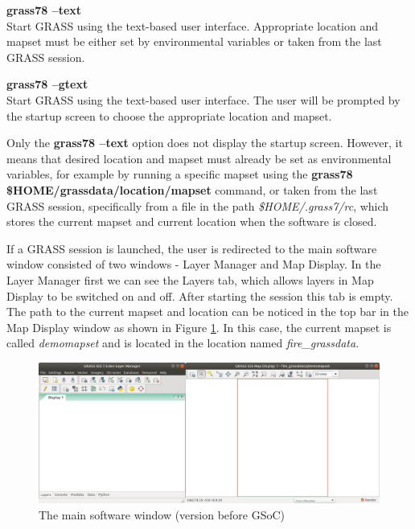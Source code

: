 \documentclass[a4paper,10pt,twoside]{article}
\begin{document}
\noindent \textbf{grass78 --text} \\
\noindent Start GRASS using the text-based user interface. Appropriate location and mapset must be either set by environmental variables or taken from the last GRASS session.

\noindent \textbf{grass78 --gtext} \\
\noindent Start GRASS using the text-based user interface. The user will be prompted by the startup screen to choose the appropriate location and mapset.

Only the \textbf{grass78 --text} option does not display the startup screen. However, it means that desired location and mapset must already be set as environmental variables, for example by running a specific mapset using the \textbf{grass78 \$HOME/grassdata/location/mapset} command, or taken from the last GRASS session, specifically from a file in the path \textit{\$HOME/.grass7/rc}, which stores the current mapset and current location when the software is closed.

If a GRASS session is launched, the user is redirected to the main software window consisted of two windows - Layer Manager and Map Display. In the Layer Manager first we can see the Layers tab, which allows layers in Map Display to be switched on and off.  After starting the session this tab is empty. The path to the current mapset and location can be noticed in the top bar in the Map Display window as shown in Figure \ref{fig:empty_layers1}. In this case, the current mapset is called \textit{demomapset} and is located in the location named \textit{fire\_grassdata}.

\vspace{0.3cm}
\begin{figure}[hbt!] 
\begin{center}
\includegraphics[width=15cm]{pictures/empty_layers1.png} 
\caption[The main software window (version before GSoC)]{The main software window (version before GSoC)}
\label{fig:empty_layers1}
\end{center}
\end{figure}
\end{document}
